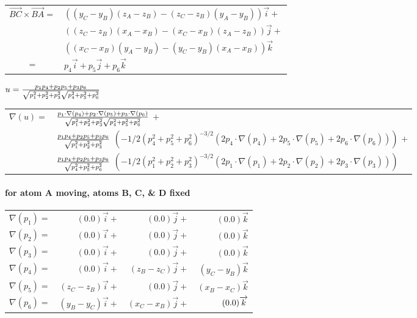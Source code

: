 \begin{tabular}{ll}
$\overrightarrow{BC}\times \overrightarrow{BA}=$ & $%
((y_{C}-y_{B})(z_{A}-z_{B})-(z_{C}-z_{B})(y_{A}-y_{B}))\overrightarrow{i}+$
\\ 
& $((z_{C}-z_{B})(x_{A}-x_{B})-(x_{C}-x_{B})(z_{A}-z_{B}))\overrightarrow{j}+
$ \\ 
& $((x_{C}-x_{B})(y_{A}-y_{B})-(y_{C}-y_{B})(x_{A}-x_{B}))\overrightarrow{k}$
\\ 
\multicolumn{1}{c}{$=$} & $p_{4}\overrightarrow{i}+p_{5}\overrightarrow{j}
+p_{6}\overrightarrow{k}$%
\end{tabular}
\medskip \medskip 

$u=\frac{p_{1}p_{4}+p_{2}p_{5}+p_{3}p_{6}}{\sqrt{%
p_{1}^{2}+p_{2}^{2}+p_{3}^{2}}\sqrt{p_{4}^{2}+p_{5}^{2}+p_{6}^{2}}}\medskip
\medskip $

\begin{tabular}{ll}
$\nabla (u)=$ & $\frac{p_{1}\cdot \nabla (p_{4})+p_{2}\cdot \nabla
(p_{5})+p_{3}\cdot \nabla (p_{6})}{\sqrt{p_{1}^{2}+p_{2}^{2}+p_{3}^{2}}\sqrt{%
p_{4}^{2}+p_{5}^{2}+p_{6}^{2}}}$ $+$ \\ 
& $\frac{p_{1}p_{4}+p_{2}p_{5}+p_{3}p_{6}}{\sqrt{%
p_{1}^{2}+p_{2}^{2}+p_{3}^{2}}}$ $\left( -1/2\left(
p_{4}^{2}+p_{5}^{2}+p_{6}^{2}\right) ^{-3/2}\left( 2p_{4}\cdot \nabla
(p_{4})+2p_{5}\cdot \nabla (p_{5})+2p_{6}\cdot \nabla (p_{6})\right) \right) 
$ $+$ \\ 
& $\frac{p_{1}p_{4}+p_{2}p_{5}+p_{3}p_{6}}{\sqrt{%
p_{4}^{2}+p_{5}^{2}+p_{6}^{2}}}$ $\left( -1/2\left(
p_{1}^{2}+p_{2}^{2}+p_{3}^{2}\right) ^{-3/2}\left( 2p_{1}\cdot \nabla
(p_{1})+2p_{2}\cdot \nabla (p_{2})+2p_{3}\cdot \nabla (p_{3})\right) \right) 
$%
\end{tabular}
\pagebreak 

\paragraph*{for atom A moving, atoms B, C, \& D fixed}

\begin{tabular}{lrrr}
$\nabla (p_{1})=$ & $(0.0)\overrightarrow{i}+$ & $(0.0)\overrightarrow{j}+$
& $(0.0)\overrightarrow{k}$ \\ 
$\nabla (p_{2})=$ & $(0.0)\overrightarrow{i}+$ & $(0.0)\overrightarrow{j}+$
& $(0.0)\overrightarrow{k}$ \\ 
$\nabla (p_{3})=$ & $(0.0)\overrightarrow{i}+$ & $(0.0)\overrightarrow{j}+$
& $(0.0)\overrightarrow{k}$ \\ 
$\nabla (p_{4})=$ & $(0.0)\overrightarrow{i}+$ & $(z_{B}-z_{C})%
\overrightarrow{j}+$ & $(y_{C}-y_{B})\overrightarrow{k}$ \\ 
$\nabla (p_{5})=$ & $(z_{C}-z_{B})\overrightarrow{i}+$ & $(0.0)%
\overrightarrow{j}+$ & $(x_{B}-x_{C})\overrightarrow{k}$ \\ 
$\nabla (p_{6})=$ & $(y_{B}-y_{C})\overrightarrow{i}+$ & $(x_{C}-x_{B})%
\overrightarrow{j}+$ & $(0.0)\nolinebreak \bigskip \overrightarrow{k}$%
\end{tabular}
\bigskip 

